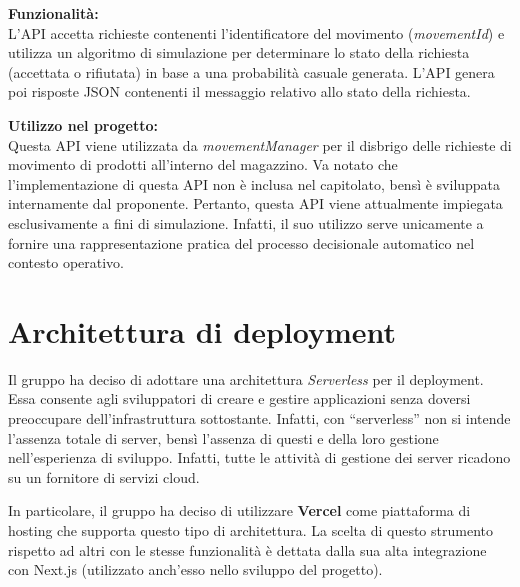 \bigskip
\noindent \textbf{Funzionalità:}\\
L'API accetta richieste contenenti l'identificatore del movimento (\textit{movementId}) e utilizza un algoritmo di simulazione per determinare lo stato della richiesta (accettata o rifiutata) in base a una probabilità casuale generata. L'API genera poi risposte JSON contenenti il messaggio relativo allo stato della richiesta.

\bigskip
\noindent \textbf{Utilizzo nel progetto:}\\
Questa API viene utilizzata da \textit{movementManager} per il disbrigo delle richieste di movimento di prodotti all'interno del magazzino. Va notato che l'implementazione di questa API non è inclusa nel capitolato, bensì è sviluppata internamente dal proponente. Pertanto, questa API viene attualmente impiegata esclusivamente a fini di simulazione. Infatti, il suo utilizzo serve unicamente a fornire una rappresentazione pratica del processo decisionale automatico nel contesto operativo.

\section{Architettura di deployment}\label{sec:architettura_deployment}
Il gruppo ha deciso di adottare una architettura \textit{Serverless} per il deployment. 
Essa consente agli sviluppatori di creare e gestire applicazioni senza doversi preoccupare dell'infrastruttura sottostante. Infatti, con ``serverless'' non si intende l'assenza totale di server, bensì l'assenza di questi e della loro gestione nell'esperienza di sviluppo. Infatti, tutte le attività di gestione dei server ricadono su un fornitore di servizi cloud.

In particolare, il gruppo ha deciso di utilizzare \textbf{Vercel} come piattaforma di hosting che supporta questo tipo di architettura. La scelta di questo strumento rispetto ad altri con le stesse funzionalità è dettata dalla sua alta integrazione con Next.js (utilizzato anch'esso nello sviluppo del progetto).
\bigskip

